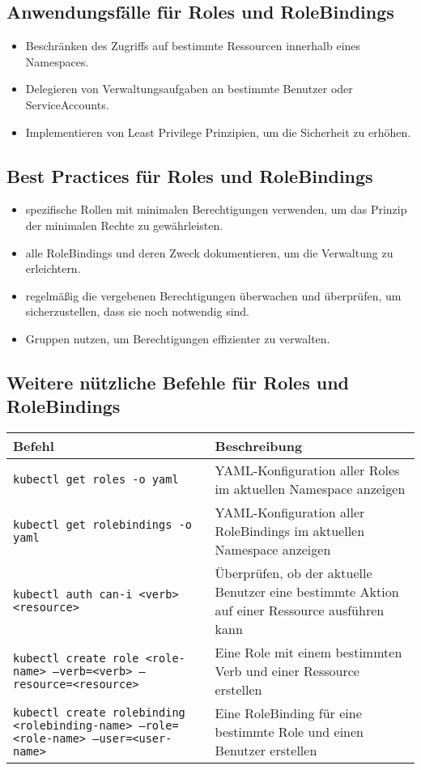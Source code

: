 \newpage
\subsection{Anwendungsfälle für Roles und RoleBindings}
\begin{itemize}
    \item Beschränken des Zugriffs auf bestimmte Ressourcen innerhalb eines Namespaces.
    \item Delegieren von Verwaltungsaufgaben an bestimmte Benutzer oder ServiceAccounts.
    \item Implementieren von Least Privilege Prinzipien, um die Sicherheit zu erhöhen.
\end{itemize}

\subsection{Best Practices für Roles und RoleBindings}
\begin{itemize}
    \item spezifische Rollen mit minimalen Berechtigungen verwenden, um das Prinzip der minimalen Rechte zu gewährleisten.
    \item alle RoleBindings und deren Zweck dokumentieren, um die Verwaltung zu erleichtern.
    \item regelmäßig die vergebenen Berechtigungen überwachen und überprüfen, um sicherzustellen, dass sie noch notwendig sind.
    \item Gruppen nutzen, um Berechtigungen effizienter zu verwalten.
\end{itemize}

\subsection{Weitere nützliche Befehle für Roles und RoleBindings}
\begin{tabular}{|p{}|p{}|}
\hline
\textbf{Befehl} & \textbf{Beschreibung} \\
\hline
\texttt{kubectl get roles -o yaml} & YAML-Konfiguration aller Roles im aktuellen Namespace anzeigen \\
\texttt{kubectl get rolebindings -o yaml} & YAML-Konfiguration aller RoleBindings im aktuellen Namespace anzeigen \\
\texttt{kubectl auth can-i <verb> <resource>} & Überprüfen, ob der aktuelle Benutzer eine bestimmte Aktion auf einer Ressource ausführen kann \\
\texttt{kubectl create role <role-name> --verb=<verb> --resource=<resource>} & Eine Role mit einem bestimmten Verb und einer Ressource erstellen \\
\texttt{kubectl create rolebinding <rolebinding-name> --role=<role-name> --user=<user-name>} & Eine RoleBinding für eine bestimmte Role und einen Benutzer erstellen \\
\hline
\end{tabular}

